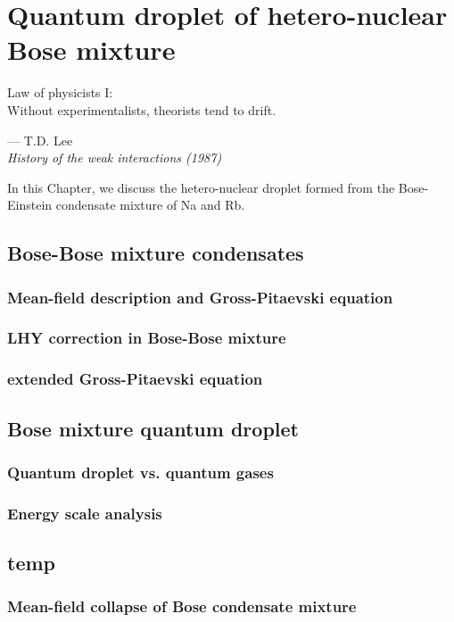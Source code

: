 \chapter{Quantum droplet of hetero-nuclear Bose mixture}
\label{Chap_droplet}

\setlength{\unitlength}{1pt}
\setlength{\epigraphwidth}{10cm}
\epigraph{Law of physicists I: \\ Without experimentalists, theorists tend to drift.}{--- T.D. Lee\\ \textit{History of the weak
interactions (1987)}}

In this Chapter, we discuss the hetero-nuclear droplet formed from the Bose-Einstein condensate mixture of Na and Rb. 

\section{Bose-Bose mixture condensates}
\subsection{Mean-field description and Gross-Pitaevski equation}
\subsection{LHY correction in Bose-Bose mixture}
\subsection{extended Gross-Pitaevski equation}

\section{Bose mixture quantum droplet}

\subsection{Quantum droplet vs. quantum gases}
\subsection{Energy scale analysis}

\section{temp}

\subsection{Mean-field collapse of Bose condensate mixture}
